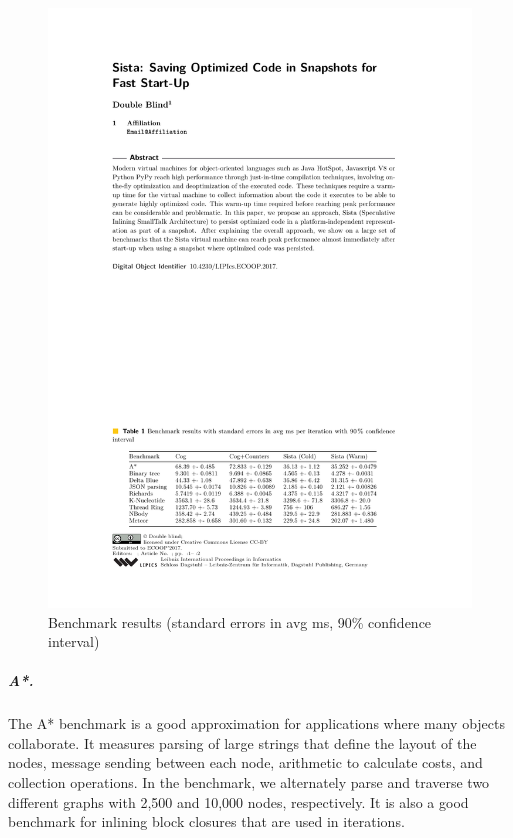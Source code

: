\documentclass[a4paper,12pt,twoside]{../includes/ThesisStyle}
\begin{document}
\begin{figure}[h!]
    \begin{center}
        \includegraphics[width=\linewidth]{BenchTable}
        \caption{Benchmark results (standard errors in avg ms, 90\% confidence interval)}
        \label{tbl:benchmark}
    \end{center}
\end{figure}

\subparagraph{A*.}

The A* benchmark is a good approximation for applications where many objects collaborate. It measures parsing of large strings that define the layout of the nodes, message sending between each node, arithmetic to calculate costs, and collection operations. In the benchmark, we alternately parse and traverse two different graphs with 2,500 and 10,000 nodes, respectively. It is also a good benchmark for inlining block closures that are used in iterations.
\end{document}
